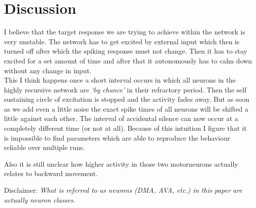 \section{Discussion} %
\label{sec:discussion}
I believe that the target response we are trying to achieve within the network is very unstable. The network has to get excited by external input which then is turned off after which the spiking response must not change. Then it has to stay excited for a set amount of time and after that it autonomously has to calm down without any change in input. \\
This I think happens once a short interval occurs in which all neurons in the highly recursive network are \textit{`by chance'} in their refractory period. Then the self sustaining circle of excitation is stopped and the activity fades away. But as soon as we add even a little noise the exact spike times of all neurons will be shifted a little against each other. The interval of accidental silence can now occur at a completely different time (or not at all). Because of this intuition I figure that it is impossible to find parameters which are able to reproduce the behaviour reliable over multiple runs. 

Also it is still unclear how higher activity in those two motorneurons actually relates to backward movement. 

\small{Disclaimer: \textit{What is referred to as neurons (DMA, AVA, etc.) in this paper are actually neuron classes.}}









